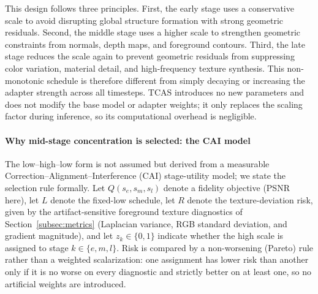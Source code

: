 \documentclass[times,twocolumn,final]{elsarticle}
\begin{document}
This design follows three principles. First, the early stage uses a conservative scale to avoid disrupting global structure formation with strong geometric residuals. Second, the middle stage uses a higher scale to strengthen geometric constraints from normals, depth maps, and foreground contours. Third, the late stage reduces the scale again to prevent geometric residuals from suppressing color variation, material detail, and high-frequency texture synthesis. This non-monotonic schedule is therefore different from simply decaying or increasing the adapter strength across all timesteps. TCAS introduces no new parameters and does not modify the base model or adapter weights; it only replaces the scaling factor during inference, so its computational overhead is negligible.

\paragraph{Why mid-stage concentration is selected: the CAI model}
The low--high--low form is not assumed but derived from a measurable Correction--Alignment--Interference (CAI) stage-utility model; we state the selection rule formally. Let $Q(s_e,s_m,s_l)$ denote a fidelity objective (PSNR here), let $L$ denote the fixed-low schedule, let $R$ denote the texture-deviation risk, given by the artifact-sensitive foreground texture diagnostics of Section~\ref{subsec:metrics} (Laplacian variance, RGB standard deviation, and gradient magnitude), and let $z_k\in\{0,1\}$ indicate whether the high scale is assigned to stage $k\in\{e,m,l\}$. Risk is compared by a non-worsening (Pareto) rule rather than a weighted scalarization: one assignment has lower risk than another only if it is no worse on every diagnostic and strictly better on at least one, so no artificial weights are introduced.
\end{document}
